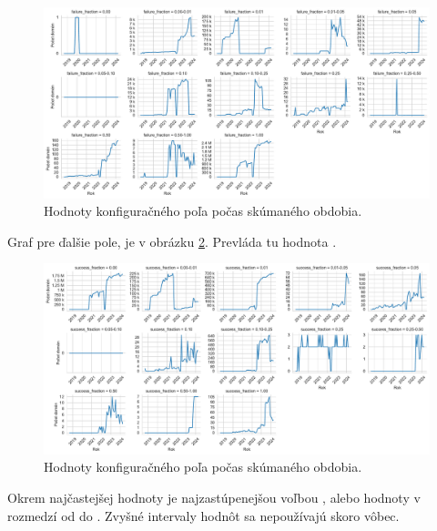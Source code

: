 \begin{figure}[!htb]
\begin{center}
 \includegraphics[scale=0.447]{obrazky-figures/httparchive_nel_config_ff_dist.pdf}
 \caption{Hodnoty konfiguračného poľa  počas skúmaného obdobia.}
 \label{fig:httparchive-nel-config-ff-dist}
\end{center}
\end{figure}

Graf pre ďalšie pole,  je v obrázku \ref{fig:httparchive-nel-config-sf-dist}. 
Prevláda tu hodnota .

\begin{figure}[!htb]
\begin{center}
 \includegraphics[scale=0.447]{obrazky-figures/httparchive_nel_config_sf_dist.pdf}
 \caption{Hodnoty konfiguračného poľa  počas skúmaného obdobia.}
 \label{fig:httparchive-nel-config-sf-dist}
\end{center}
\end{figure}

\pagebreak

\noindent Okrem najčastejšej hodnoty je najzastúpenejšou voľbou , alebo hodnoty v rozmedzí od  do .
Zvyšné intervaly hodnôt sa nepoužívajú skoro vôbec.


